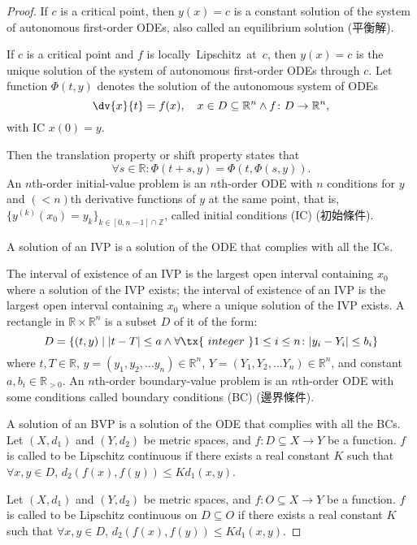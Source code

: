 \documentclass[a4paper,12pt]{report}
\begin{document}
\begin{itemize}
\begin{itemize}
\begin{proof}
If $c$ is a critical point, then $y(x)=c$ is a constant solution of the system of autonomous first-order ODEs, also called an equilibrium solution (平衡解).

If $c$ is a critical point and $f$ is locally Lipschitz at $c$, then $y(x)=c$ is the unique solution of the system of autonomous first-order ODEs through $c$.
Let function $\Phi(t,y)$ denotes the solution of the autonomous system of ODEs
\[\dv{x}{t}=f(x),\quad x\in D\subseteq\mathbb{R}^n\land f\colon D\to\mathbb{R}^n,\]
with IC $x(0)=y$.

Then the translation property or shift property states that
\[\forall s\in\mathbb{R}\colon\Phi(t+s,y)=\Phi(t,\Phi(s,y)).\]
An $n$th-order initial-value problem is an $n$th-order ODE with $n$ conditions for $y$ and $(<n)$th derivative functions of $y$ at the same point, that is, $\{y^{(k)}(x_0)=y_k\}_{k\in[0,n-1]\cap\mathbb{Z}}$, called initial conditions (IC) (初始條件).

A solution of an IVP is a solution of the ODE that complies with all the ICs.

The interval of existence of an IVP is the largest open interval containing $x_0$ where a solution of the IVP exists; the interval of existence of an IVP is the largest open interval containing $x_0$ where a unique solution of the IVP exists.
A rectangle in $\mathbb{R}\times\mathbb{R}^n$ is a subset $D$ of it of the form:
\[D=\{(t,y)\mid|t-T|\leq a\land\forall\tx{\ integer\ }1\leq i\leq n\colon |y_i-Y_i|\leq b_i\}\]
where $t,T\in\mathbb{R}$, $y=(y_1, y_2,\dots  y_n)\in\mathbb{R}^n$, $Y=(Y_1, Y_2,\dots  Y_n)\in\mathbb{R}^n$, and constant $a,b_i\in\mathbb{R}_{>0}$.
An $n$th-order boundary-value problem is an $n$th-order ODE with some conditions called boundary conditions (BC) (邊界條件).

A solution of an BVP is a solution of the ODE that complies with all the BCs.
Let $(X,d_1)$ and $(Y,d_2)$ be metric spaces, and $f\colon D\subseteq X\to Y$ be a function. $f$ is called to be Lipschitz continuous if there exists a real constant $K$ such that $\forall x,y\in D$, $d_{2}(f(x),f(y))\leq Kd_{1}(x,y)$.

Let $(X,d_1)$ and $(Y,d_2)$ be metric spaces, and $f\colon O\subseteq X\to Y$ be a function. $f$ is called to be Lipschitz continuous on $D\subseteq O$ if there exists a real constant $K$ such that $\forall x,y\in D$, $d_{2}(f(x),f(y))\leq Kd_{1}(x,y)$.


\end{proof}
\end{itemize}
\end{itemize}
\end{document}
